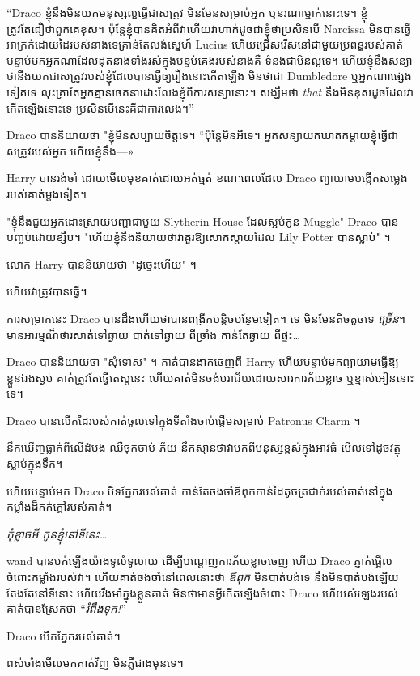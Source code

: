 {{{{{{{{“Draco ខ្ញុំនឹងមិនយកមនុស្សល្អធ្វើជាសត្រូវ មិនមែនសម្រាប់អ្នក ឬនរណាម្នាក់នោះទេ។ ខ្ញុំត្រូវតែជឿថាពួកគេខុស។ ប៉ុន្តែខ្ញុំបានគិតអំពីវាហើយវាហាក់ដូចជាខ្ញុំថាប្រសិនបើ Narcissa មិនបានធ្វើអាក្រក់ដោយដៃរបស់នាងទេគ្រាន់តែលង់ស្នេហ៍ Lucius ហើយជ្រើសរើសនៅជាមួយប្រពន្ធរបស់គាត់បន្ទាប់មកអ្នកណាដែលដុតនាងទាំងរស់ក្នុងបន្ទប់គេងរបស់នាងគឺ ទំនង​ជា​មិន​ល្អ​ទេ។ ហើយ​ខ្ញុំ​នឹង​សន្យា​ថា​នឹង​យក​ជា​សត្រូវ​របស់​ខ្ញុំ​ដែល​បាន​ធ្វើ​ឲ្យ​រឿង​នោះ​កើត​ឡើង មិន​ថា​ជា Dumbledore ឬ​អ្នក​ណា​ផ្សេង​ទៀត​ទេ លុះត្រា​តែ​អ្នក​គ្មាន​ចេតនា​ដោះលែង​ខ្ញុំ​ពី​ការ​សន្យា​នោះ។ សង្ឃឹមថា \emph{that} នឹងមិនខុសដូចដែលវាកើតឡើងនោះទេ ប្រសិនបើនេះគឺជាការលេង។”

Draco បាននិយាយថា "ខ្ញុំមិនសប្បាយចិត្តទេ។ “ប៉ុន្តែមិនអីទេ។ អ្នក​សន្យា​យក​ឃាតក​ម្តាយ​ខ្ញុំ​ធ្វើ​ជា​សត្រូវ​របស់​អ្នក ហើយ​ខ្ញុំ​នឹង—»

Harry បានរង់ចាំ ដោយមើលមុខគាត់ដោយអត់ធ្មត់ ខណៈពេលដែល Draco ព្យាយាមបង្កើតសម្លេងរបស់គាត់ម្តងទៀត។

"ខ្ញុំនឹងជួយអ្នកដោះស្រាយបញ្ហាជាមួយ Slytherin House ដែលស្អប់កូន Muggle" Draco បានបញ្ចប់ដោយខ្សឹប។ "ហើយ​ខ្ញុំ​នឹង​និយាយ​ថា​វា​គួរ​ឱ្យ​សោក​ស្តាយ​ដែល Lily Potter បាន​ស្លាប់" ។

លោក Harry បាននិយាយថា "ដូច្នេះហើយ" ។

ហើយវាត្រូវបានធ្វើ។

ការសម្រាកនេះ Draco បានដឹងហើយថាបានពង្រីកបន្តិចបន្ថែមទៀត។ ទេ មិនមែនតិចតួចទេ \emph{ច្រើន}។ មានអារម្មណ៏ថារសាត់ទៅឆ្ងាយ បាត់ទៅឆ្ងាយ ពីច្រាំង កាន់តែឆ្ងាយ ពីផ្ទះ…

Draco បាននិយាយថា "សុំទោស" ។ គាត់បានងាកចេញពី Harry ហើយបន្ទាប់មកព្យាយាមធ្វើឱ្យខ្លួនឯងស្ងប់ គាត់ត្រូវតែធ្វើតេស្តនេះ ហើយគាត់មិនចង់បរាជ័យដោយសារការភ័យខ្លាច ឬខ្មាស់អៀននោះទេ។

Draco បានលើកដៃរបស់គាត់ចូលទៅក្នុងទីតាំងចាប់ផ្តើមសម្រាប់ Patronus Charm ។

នឹកឃើញធ្លាក់ពីលើដំបង ឈឺចុកចាប់ ភ័យ នឹកស្មានថាវាមកពីមនុស្សខ្ពស់ក្នុងអាវធំ មើលទៅដូចវត្ថុស្លាប់ក្នុងទឹក។

ហើយបន្ទាប់មក Draco បិទភ្នែករបស់គាត់ កាន់តែចងចាំឪពុកកាន់ដៃតូចត្រជាក់របស់គាត់នៅក្នុងកម្លាំងដ៏កក់ក្តៅរបស់គាត់។

\emph{កុំខ្លាចអី កូនខ្ញុំនៅទីនេះ…}

wand បានបក់ឡើងយ៉ាងទូលំទូលាយ ដើម្បីបណ្តេញការភ័យខ្លាចចេញ ហើយ Draco ភ្ញាក់ផ្អើលចំពោះកម្លាំងរបស់វា។ ហើយគាត់ចងចាំនៅពេលនោះថា \emph{ឪពុក} មិនបាត់បង់ទេ នឹងមិនបាត់បង់ឡើយ តែងតែនៅទីនោះ ហើយរឹងមាំក្នុងខ្លួនគាត់ មិនថាមានអ្វីកើតឡើងចំពោះ Draco ហើយសំឡេងរបស់គាត់បានស្រែកថា “\emph {រំពឹង​ទុក!}”

Draco បើកភ្នែករបស់គាត់។

ពស់​ចាំង​មើល​មក​គាត់​វិញ មិន​ភ្លឺ​ជាង​មុន​ទេ។

}}}}}}}}
